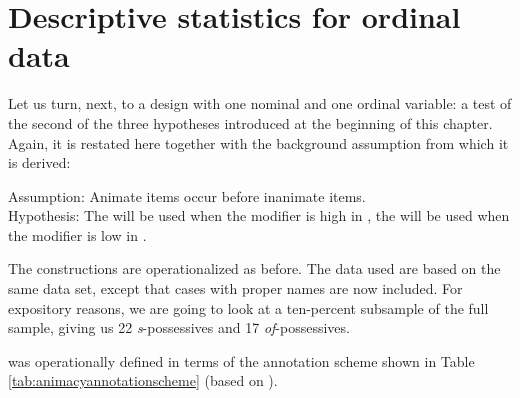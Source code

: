 
\section{Descriptive statistics for ordinal data}
\label{sec:descriptiveordinal}

Let us turn, next, to a design with one nominal and one ordinal variable: a test of the second of the three hypotheses introduced at the beginning of this chapter. Again, it is restated here together with the background assumption from which it is derived:

\begin{exe}
\ex Assumption: Animate items occur before inanimate items. \\
Hypothesis: The  will be used when the modifier is high in , the  will be used when the modifier is low in .
\label{ex:animacyhypothesis}
\end{exe}

The constructions are operationalized as before. The data used are based on the same data set, except that cases with proper names are now included. For expository reasons, we are going to look at a ten-percent subsample of the full sample, giving us 22 \textit{s}-possessives and 17 \textit{of}-possessives.

 was operationally defined in terms of the annotation scheme shown in Table \ref{tab:animacyannotationscheme} (based on \citep{zaenen_animacy_2004}).

\begin{table}[!htbp]
\caption{A simple annotation scheme for }
\label{tab:animacyannotationscheme}
\end{table}

